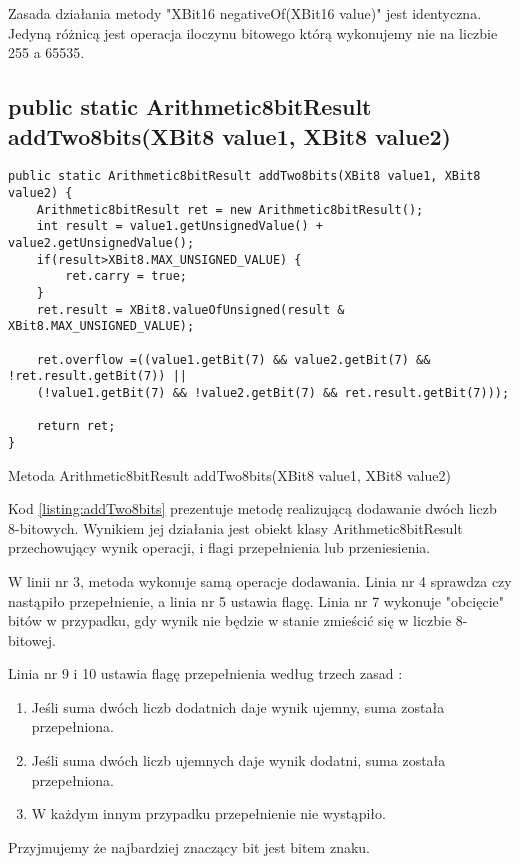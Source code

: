 	Zasada działania metody "XBit16 negativeOf(XBit16 value)" jest identyczna. Jedyną różnicą jest operacja iloczynu bitowego którą wykonujemy nie na liczbie 255 a 65535.
	
	\subsection{public static Arithmetic8bitResult addTwo8bits(XBit8 value1, XBit8 value2)}
	\begin{listing}[h]
		\begin{verbatim}
public static Arithmetic8bitResult addTwo8bits(XBit8 value1, XBit8 value2) {
	Arithmetic8bitResult ret = new Arithmetic8bitResult();
	int result = value1.getUnsignedValue() + value2.getUnsignedValue();
	if(result>XBit8.MAX_UNSIGNED_VALUE) {
		ret.carry = true;
	}
	ret.result = XBit8.valueOfUnsigned(result & XBit8.MAX_UNSIGNED_VALUE);
	
	ret.overflow =((value1.getBit(7) && value2.getBit(7) && !ret.result.getBit(7)) ||
	(!value1.getBit(7) && !value2.getBit(7) && ret.result.getBit(7)));
	
	return ret;
}
		\end{verbatim}
		\caption{Metoda Arithmetic8bitResult addTwo8bits(XBit8 value1, XBit8 value2)}
		\label{listing:addTwo8bits}
	\end{listing}
	Kod \ref{listing:addTwo8bits} prezentuje metodę realizującą dodawanie dwóch liczb 8-bitowych. Wynikiem jej działania jest obiekt klasy Arithmetic8bitResult przechowujący wynik operacji, i flagi przepełnienia lub przeniesienia. 
	
	W linii nr 3, metoda wykonuje samą operacje dodawania. Linia nr 4 sprawdza czy nastąpiło przepełnienie, a linia nr 5 ustawia flagę. Linia nr 7 wykonuje "obcięcie" bitów w przypadku, gdy wynik nie będzie w stanie zmieścić się w liczbie 8-bitowej. 
	
	Linia nr 9 i 10 ustawia flagę przepełnienia według trzech zasad \cite{overflowRules}:
	\begin{enumerate}
		\item Jeśli suma dwóch liczb dodatnich daje wynik ujemny, suma została przepełniona. 
		\item Jeśli suma dwóch liczb ujemnych daje wynik dodatni, suma została przepełniona.
		\item W każdym innym przypadku przepełnienie nie wystąpiło.
	\end{enumerate}
	Przyjmujemy że najbardziej znaczący bit jest bitem znaku.
	
